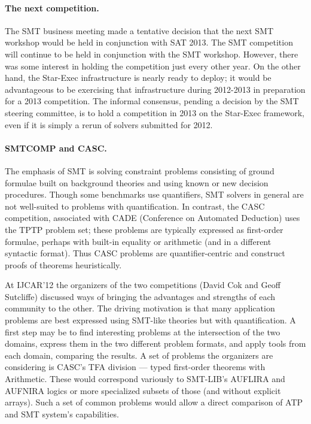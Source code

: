 \documentclass[twosize,11pt]{article}
\begin{document}
\paragraph{The next competition.} The SMT business meeting made a tentative decision that the next SMT workshop would be held in conjunction with SAT 2013. The SMT competition will continue to be held in conjunction with the SMT workshop. However, there was some interest in holding the competition just every other year. On the other hand, the Star-Exec infrastructure is nearly ready to deploy; it would be advantageous to be exercising that infrastructure during 2012-2013 in preparation for a 2013 competition. The informal consensus, pending a decision by the SMT steering committee, is to hold a competition in 2013 on the Star-Exec framework, even if it is simply a rerun of solvers submitted for 2012.

\paragraph{SMTCOMP and CASC.}

The emphasis of SMT is solving constraint problems consisting of ground formulae built on background theories and using known or new decision procedures. Though some benchmarks use quantifiers, SMT solvers in general are not well-suited to problems with quantification. In contrast, the CASC competition, associated with CADE (Conference on Automated Deduction) uses the TPTP problem set; these problems are typically expressed as first-order formulae, perhaps with built-in equality or arithmetic (and in a different syntactic format). Thus CASC problems are quantifier-centric and construct proofs of theorems heuristically.

At IJCAR'12 the organizers of the two competitions (David Cok and Geoff Sutcliffe) discussed ways of bringing the advantages and strengths of each community to the other. The driving motivation is that many application problems are best expressed using SMT-like theories but with quantification. A first step may be to find interesting problems at the 
intersection of the two domains, express them in the two different problem formats, and apply tools from each domain, comparing the results. A set of problems the organizers are considering is CASC's TFA division --- typed first-order theorems with Arithmetic. These would correspond variously to SMT-LIB's AUFLIRA and AUFNIRA logics or more specialized subsets of those (and without explicit arrays). Such a set of common problems would allow a direct comparison of ATP and SMT system's capabilities.
   
\end{document}
